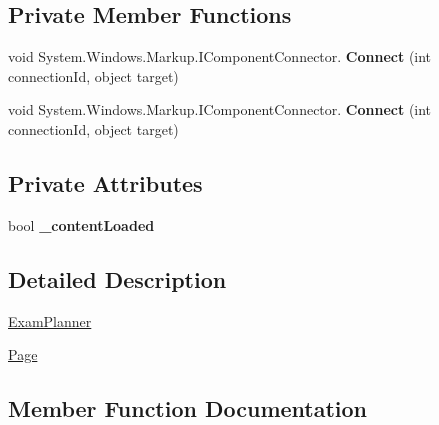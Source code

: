 \subsection*{Private Member Functions}
\begin{DoxyCompactItemize}
\item 
\mbox{\label{class_t_h_b___plugin___exams_1_1_exam_planner_1_1_page_a7420e1cc3c5b7067cf3d8d5ea22080df}} 
void System.\+Windows.\+Markup.\+I\+Component\+Connector. {\bfseries Connect} (int connection\+Id, object target)
\item 
\mbox{\label{class_t_h_b___plugin___exams_1_1_exam_planner_1_1_page_a7420e1cc3c5b7067cf3d8d5ea22080df}} 
void System.\+Windows.\+Markup.\+I\+Component\+Connector. {\bfseries Connect} (int connection\+Id, object target)
\end{DoxyCompactItemize}
\subsection*{Private Attributes}
\begin{DoxyCompactItemize}
\item 
\mbox{\label{class_t_h_b___plugin___exams_1_1_exam_planner_1_1_page_a17fe4c281fd0694fd9974359f77f66f7}} 
bool {\bfseries \+\_\+content\+Loaded}
\end{DoxyCompactItemize}


\subsection{Detailed Description}
\mbox{\hyperlink{class_t_h_b___plugin___exams_1_1_exam_planner}{Exam\+Planner}} 

\mbox{\hyperlink{class_t_h_b___plugin___exams_1_1_exam_planner_1_1_page}{Page}} 

\subsection{Member Function Documentation}
\mbox{\label{class_t_h_b___plugin___exams_1_1_exam_planner_1_1_page_a847df3ab7efff49dde2471c64a8ea0b7}} 
